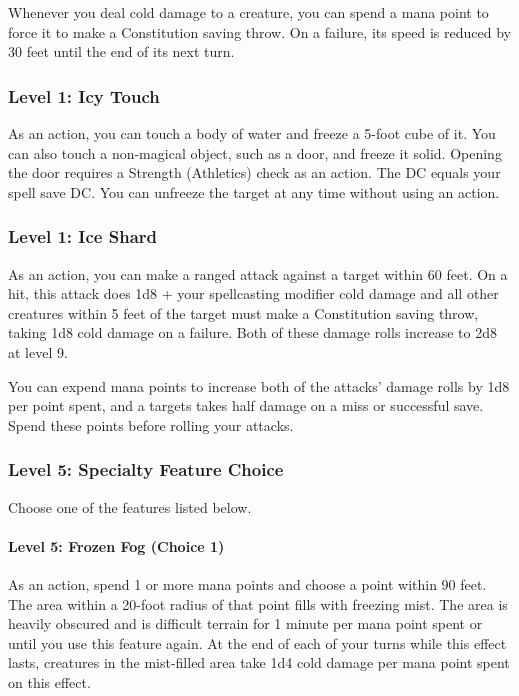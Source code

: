\documentclass[12pt,letterpaper,twocolumn,openany,nodeprecatedcode,bg=none]{dndbook}
\begin{document}
Whenever you deal cold damage to a creature, you can spend a mana point
to force it to make a Constitution saving throw. On a failure, its speed
is reduced by 30 feet until the end of its next turn.

\subsubsection{Level 1: Icy Touch}\label{level-1-icy-touch}

As an action, you can touch a body of water and freeze a 5-foot cube of
it. You can also touch a non-magical object, such as a door, and freeze
it solid. Opening the door requires a Strength (Athletics) check as an
action. The DC equals your spell save DC. You can unfreeze the target at
any time without using an action.

\subsubsection{Level 1: Ice Shard}\label{level-1-ice-shard}

As an action, you can make a ranged attack against a target within 60
feet. On a hit, this attack does 1d8 + your spellcasting modifier cold
damage and all other creatures within 5 feet of the target must make a
Constitution saving throw, taking 1d8 cold damage on a failure. Both of
these damage rolls increase to 2d8 at level 9.

You can expend mana points to increase both of the attacks' damage rolls
by 1d8 per point spent, and a targets takes half damage on a miss or
successful save. Spend these points before rolling your attacks.

\subsubsection{Level 5: Specialty Feature
Choice}\label{level-5-specialty-feature-choice-1}

Choose one of the features listed below.

\paragraph{Level 5: Frozen Fog (Choice
1)}\label{level-5-frozen-fog-choice-1}

As an action, spend 1 or more mana points and choose a point within 90
feet. The area within a 20-foot radius of that point fills with freezing
mist. The area is heavily obscured and is difficult terrain for 1 minute
per mana point spent or until you use this feature again. At the end of
each of your turns while this effect lasts, creatures in the mist-filled
area take 1d4 cold damage per mana point spent on this effect.
\end{document}
